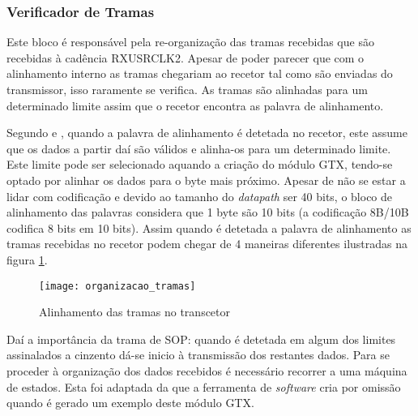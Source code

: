 \subsubsection*{Verificador de Tramas} \label{subsub:serial_frameChecker}
  

Este bloco é responsável pela re-organização das tramas recebidas que são recebidas à cadência RXUSRCLK2. Apesar de poder parecer que com o alinhamento interno as tramas chegariam ao recetor tal como são enviadas do transmissor, isso raramente se verifica. As tramas são alinhadas para um determinado limite assim que o recetor encontra as palavra de alinhamento. %

Segundo \cite{R022} e \cite{R011}, quando a palavra de alinhamento é detetada no recetor, este assume que os dados a partir daí são válidos e alinha-os para um determinado limite. Este limite pode ser selecionado aquando a criação do módulo GTX, tendo-se optado por alinhar os dados para o byte mais próximo. Apesar de não se estar a lidar com codificação e devido ao tamanho do \textit{datapath} ser 40 bits, o bloco de alinhamento das palavras considera que 1 byte são 10 bits (a codificação 8B/10B codifica 8 bits em 10 bits). Assim quando é detetada a palavra de alinhamento as tramas recebidas no recetor podem chegar de 4 maneiras diferentes ilustradas na figura \ref{fig:alinhamento_tramas_gtx}.


\begin{figure}[h!]
		\begin{center}
		\leavevmode
		\texttt{[image: organizacao\_tramas]}
		\captionsetup{width=1.0\linewidth}
		\caption[Alinhamento das tramas no transcetor]{Alinhamento das tramas no transcetor}
		\label{fig:alinhamento_tramas_gtx}
	\end{center}
\end{figure}

Daí a importância da trama de SOP: quando é detetada em algum dos limites assinalados a cinzento dá-se inicio à transmissão dos restantes dados. Para se proceder à organização dos dados recebidos é necessário recorrer a uma máquina de estados. Esta foi adaptada da que a ferramenta de \textit{software} cria por omissão quando é gerado um exemplo deste módulo GTX.

